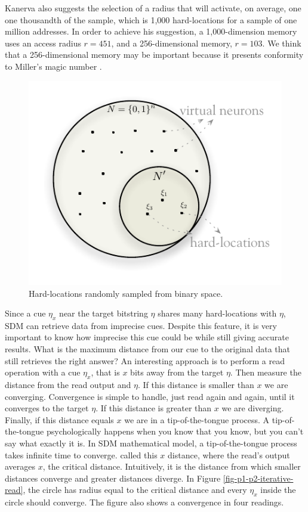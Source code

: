 Kanerva also suggests the selection of a radius that will activate, on average, one one thousandth of the sample, which is 1,000 hard-locations for a sample of one million addresses. In order to achieve his suggestion, a 1,000-dimension memory uses an access radius $r=451$, and a 256-dimensional memory, $r=103$. We think that a 256-dimensional memory may be important because it presents conformity to Miller's magic number \citep{Linhares2011}.

\begin{figure}[h]
\centering\includegraphics[scale=0.75]{./images02/hardlocations.pdf}

\caption{Hard-locations randomly sampled from binary space.\label{fig-hardlocations}}
\end{figure}


Since a cue $\eta_{x}$ near the target bitstring $\eta$ shares many hard-locations with $\eta$, SDM can retrieve data from imprecise cues. Despite this feature, it is very important to know how imprecise this cue could be while still giving accurate results. What is the maximum distance from our cue to the original data that still retrieves the right answer? An interesting approach is to perform a read operation with a cue $\eta_{x}$, that is $x$ bits away from the target $\eta$.  Then measure the distance from the read output and $\eta$. If this distance is smaller than $x$ we are converging. Convergence is simple to handle, just read again and again, until it converges to the target $\eta$. If this distance is greater than $x$ we are diverging. Finally, if this distance equals $x$ we are in a tip-of-the-tongue process.  A tip-of-the-tongue psychologically happens when you know that you know, but you can't say what exactly it is. In SDM mathematical model, a tip-of-the-tongue process takes infinite time to converge. \citet{Kanerva1988} called this $x$ distance, where the read's output averages $x$, the critical distance. Intuitively, it is the distance from which smaller distances converge and greater distances diverge. In Figure \ref{fig-p1-p2-iterative-read}, the circle has radius equal to the critical distance and every $\eta_{x}$ inside the circle should converge.  The figure also shows a convergence in four readings.

